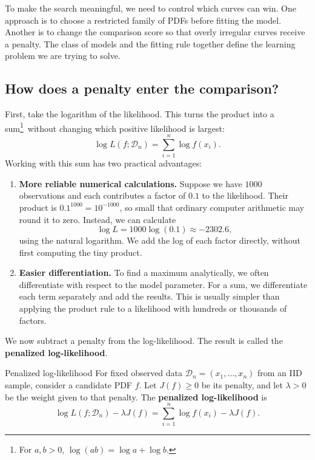 \documentclass[a4paper,12pt,oneside]{report}
\begin{document}
\begin{notebox}
To make the search meaningful, we need to control which curves
can win. One approach is to choose a restricted family of PDFs
before fitting the model. Another is to change the comparison
score so that overly irregular curves receive a penalty.
The class of models and the fitting rule together define the
learning problem we are trying to solve.
\end{notebox}

\subsection{How does a penalty enter the comparison?}

First, take the logarithm of the likelihood. This turns the product
into a sum\begingroup\renewcommand{\thefootnote}{\fnsymbol{footnote}}\footnote[1]{%
For $a,b>0$, $\log(ab)=\log a+\log b$.}\endgroup\ without changing
which positive likelihood is largest:
\[
  \log L(f;\mathcal D_n)=\sum_{i=1}^n\log f(x_i).
\]
Working with this sum has two practical advantages:
\begin{enumerate}
  \item \textbf{More reliable numerical calculations.}
  Suppose we have $1000$ observations and each contributes a
  factor of $0.1$ to the likelihood. Their product is
  $0.1^{1000}=10^{-1000}$, so small that ordinary computer
  arithmetic may round it to zero. Instead, we can calculate
  \[
    \log L=1000\log(0.1)\approx-2302.6,
  \]
  using the natural logarithm. We add the log of each factor
  directly, without first computing the tiny product.

  \item \textbf{Easier differentiation.}
  To find a maximum analytically, we often differentiate with
  respect to the model parameter. For a sum, we differentiate
  each term separately and add the results. This is usually
  simpler than applying the product rule to a likelihood with
  hundreds or thousands of factors.
\end{enumerate}

We now subtract a penalty from the log-likelihood. The result is
called the \textbf{penalized log-likelihood}.

\begin{frameddefn}{Penalized log-likelihood}
\label{def:penalized-log-likelihood}
For fixed observed data $\mathcal D_n=(x_1,\ldots,x_n)$ from an
IID sample, consider a candidate PDF $f$. Let $J(f)\geq0$ be
its penalty, and let $\lambda>0$ be the weight given to that
penalty. The \textbf{penalized log-likelihood} is
\[
  \log L(f;\mathcal D_n)-\lambda J(f)
    =\sum_{i=1}^n\log f(x_i)-\lambda J(f).
\]
\end{frameddefn}
\end{document}
